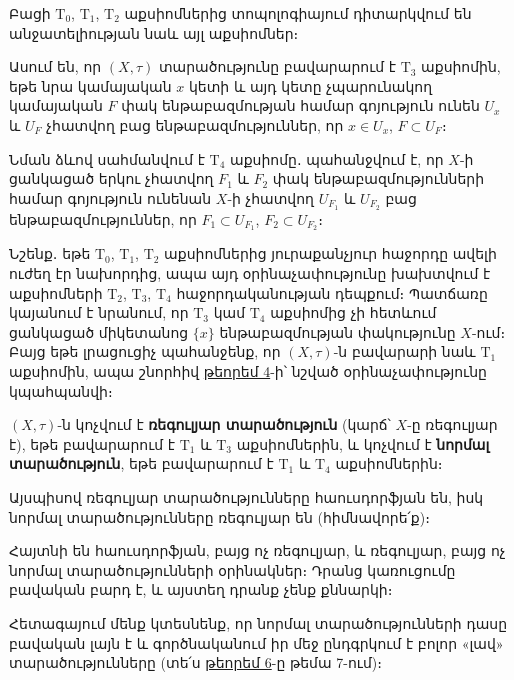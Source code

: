 \documentclass[./main.tex]{subfiles}
\begin{document}
\par Բացի $\textrm{T}_0$, $\textrm{T}_1$, $\textrm{T}_2$ աքսիոմներից տոպոլոգիայում դիտարկվում են անջատելի\-ու\-թյան նաև այլ աքսիոմներ։ 

\begin{definition} Ասում են, որ $(X, \tau)$ տարածությունը բավարարում է $\textrm{T}_3$ աքսիոմին, եթե նրա կամայական $x$ կետի և այդ կետը չպարունակող կամայական $F$ փակ ենթաբազմության համար գոյություն ունեն $U_x$ և $U_F$ չհատվող բաց ենթաբազմու\-թյուն\-ներ, որ $x \in U_x$, $F \subset U_F$։
\end{definition}

\par Նման ձևով սահմանվում է $\textrm{T}_4$ աքսիոմը․ պահանջվում է, որ $X$-ի ցանկացած երկու չհատվող $F_1$ և $F_2$ փակ ենթաբազմությունների համար գոյություն ունենան $X$-ի չհատվող $U_{F_1}$ և $U_{F_2}$ բաց ենթաբազմություններ, որ $F_1 \subset U_{F_1}$, $F_2 \subset U_{F_2}$։

\par Նշենք․ եթե $\textrm{T}_0$, $\textrm{T}_1$, $\textrm{T}_2$ աքսիոմներից յուրաքանչյուր հաջորդը ավելի ուժեղ էր նախորդից, ապա այդ օրինաչափությունը խախտվում է աքսիոմների $\textrm{T}_2$, $\textrm{T}_3$, $\textrm{T}_4$ հաջորդականության դեպքում։ Պատճառը կայանում է նրանում, որ $\textrm{T}_3$ կամ $\textrm{T}_4$ աքսիոմից չի հետևում ցանկացած միկետանոց $\{x\}$ ենթաբազմության փակությունը $X$-ում։ Բայց եթե լրացուցիչ պահանջենք, որ $(X, \tau)$-ն բավարարի նաև $\textrm{T}_1$ աքսիոմին, ապա շնորհիվ \hyperref[ch5thm4]{թեորեմ 4}-ի՝ նշված օրինաչափությունը կպահպանվի։ 

\begin{definition} 
$(X, \tau)$-ն կոչվում է \textbf{ռեգուլյար տարածություն} (կարճ՝ $X$-ը ռեգուլ\-յար է), եթե բավարարում է $\textrm{T}_1$ և $\textrm{T}_3$ աքսիոմներին, և կոչվում է \textbf{նորմալ տարա\-ծու\-թյուն}, եթե բավարարում է $\textrm{T}_1$ և $\textrm{T}_4$ աքսիոմներին։
\end{definition}    

\par Այսպիսով ռեգուլյար տարածությունները հաուսդորֆյան են, իսկ նորմալ տարա\-ծությունները ռեգուլյար են (հիմնավորե՛ք)։ 

\par Հայտնի են հաուսդորֆյան, բայց ոչ ռեգուլյար, և ռեգուլյար, բայց ոչ նորմալ տարածությունների օրինակներ։ Դրանց կառուցումը բավական բարդ է, և այստեղ դրանք չենք քննարկի։

\par Հետագայում մենք կտեսնենք, որ նորմալ տարածությունների դասը բավական լայն է և գործնականում իր մեջ ընդգրկում է բոլոր «լավ» տարածությունները (տե՛ս \hyperref[ch7thm6]{թեորեմ 6}-ը թեմա 7-ում)։




\end{document}
